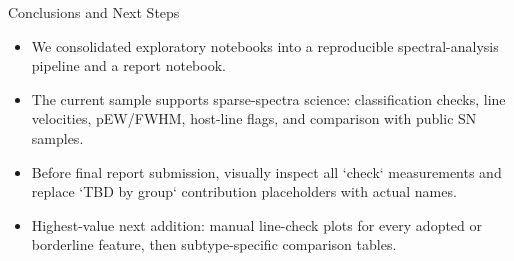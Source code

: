 \documentclass[aspectratio=169,professionalfonts]{beamer}
\begin{document}
\begin{frame}{Conclusions and Next Steps}
  \begin{itemize}
    \item We consolidated exploratory notebooks into a reproducible spectral-analysis pipeline and a report notebook.
    \item The current sample supports sparse-spectra science: classification checks, line velocities, pEW/FWHM, host-line flags, and comparison with public SN samples.
    \item Before final report submission, visually inspect all `check` measurements and replace `TBD by group` contribution placeholders with actual names.
    \item Highest-value next addition: manual line-check plots for every adopted or borderline feature, then subtype-specific comparison tables.
  \end{itemize}
\end{frame}
\end{document}
